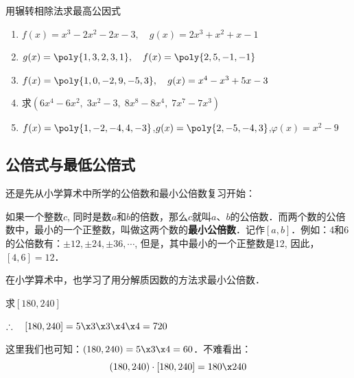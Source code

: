 \begin{ex}
用辗转相除法求最高公因式
\begin{enumerate}
    \item $f (x) =x^3-2x^2-2x-3,\quad g (x) =2x^3+x^2+x-1$
    \item $g(x)=\poly{1,3,2,3,1},\quad f(x)=\poly{2,5,-1,-1}$
    \item $f(x)=\poly{1,0,-2,9,-5,3},\quad g(x)=x^4-x^3+5x-3$
    \item 求$(6x^4-6x^2,\; 3x^2-3,\; 8x^8-8x^4,\; 7x^7-7x^3)$
    \item $f(x)=\poly{1,-2,-4,4,-3}$,\quad $g(x)=\poly{2,-5,-4,3}$,\quad $\varphi(x)=x^2-9$
\end{enumerate}
\end{ex}




\subsection{公倍式与最低公倍式}
还是先从小学算术中所学的公倍数和最小公倍数复习开始：

如果一个整数$c$, 同时是数$a$和$b$的倍数，那么$c$就叫$a$、$b$的公倍数．而两个数的公倍数中，最小的一个正整数，叫做这两个数的\textbf{最小公倍数}．记作$[a,b]$．例如：4和6的公倍数有：$\pm 12,\pm 24,\pm 36,\cdots$, 但是，其中最小的一个正整数是12, 因此，$[4, 6]=12$．

在小学算术中，也学习了用分解质因数的方法求最小公倍数．

\begin{example}
求$[180, 240]$
\end{example}

\begin{solution}
\begin{center}
\end{center}

$\therefore\quad [180, 240] =5\x3\x3\x4\x4=720$

这里我们也可知：$(180, 240)=5\x3\x4=60$．不难看出：
\[(180, 240)\cdot [180, 240]=180\x 240\]

\end{solution}

